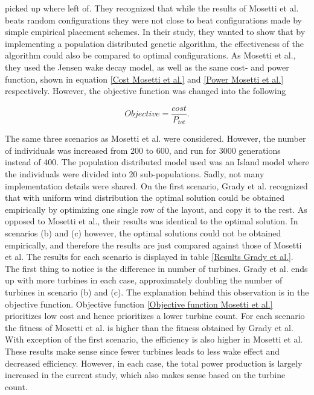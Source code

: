 \noindent \cite{Grady} picked up where \cite{Mosetti} left of. They recognized that while the results of Mosetti et al. beats random configurations they were not close to beat configurations made by simple empirical placement schemes. In their study, they wanted to show that by implementing a population distributed genetic algorithm, the effectiveness of the algorithm could also be compared to optimal configurations.	 As Mosetti et al., they used the Jensen wake decay model, as well as the same cost- and power function, shown in equation \ref{Cost Mosetti et al.} and \ref{Power Mosetti et al.} respectively. However, the objective function was changed into the following

\begin{equation}
Objective = \frac{cost}{P_{tot}}.
\label{Objective function Grady et al.}
\end{equation}


\noindent The same three scenarios as Mosetti et al. were considered. However, the number of individuals was increased from 200 to 600, and run for 3000 generations instead of 400. The population distributed model used was an Island model where the individuals were divided into 20 sub-populations. Sadly, not many implementation details were shared. On the first scenario, Grady et al. recognized that with uniform wind distribution the optimal solution could be obtained empirically by optimizing one single row of the layout, and copy it to the rest. As opposed to Mosetti et al., their results was identical to the optimal solution. In scenarios (b) and (c) however, the optimal solutions could not be obtained empirically, and therefore the results are just compared against those of Mosetti et al. The results for each scenario is displayed in table \ref{Results Grady et al.}. The first thing to notice is the difference in number of turbines. Grady et al. ends up with more turbines in each case, approximately doubling the number of turbines in scenario (b) and (c). The explanation behind this observation is in the objective function. Objective function \ref{Objective function Mosetti et al.} prioritizes low cost and hence prioritizes a lower turbine count. For each scenario the fitness of Mosetti et al. is higher than the fitness obtained by Grady et al. With exception of the first scenario, the efficiency is also higher in Mosetti et al. These results make sense since fewer turbines leads to less wake effect and decreased efficiency. However, in each case, the total power production is largely increased in the current study, which also makes sense based on the turbine count. \\


